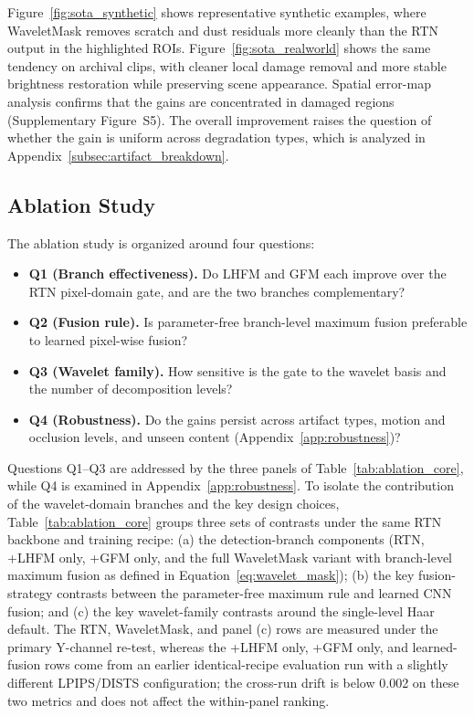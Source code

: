 \documentclass[applsci,article,submit,pdftex,moreauthors]{Definitions/mdpi}
\begin{document}
Figure~\ref{fig:sota_synthetic} shows representative synthetic examples, where WaveletMask removes scratch and dust residuals more cleanly than the RTN output in the highlighted ROIs. Figure~\ref{fig:sota_realworld} shows the same tendency on archival clips, with cleaner local damage removal and more stable brightness restoration while preserving scene appearance. Spatial error-map analysis confirms that the gains are concentrated in damaged regions (Supplementary Figure~S5). The overall improvement raises the question of whether the gain is uniform across degradation types, which is analyzed in Appendix~\ref{subsec:artifact_breakdown}.

\subsection{Ablation Study}\label{subsec:ablation}

The ablation study is organized around four questions:
\begin{itemize}
\item \textbf{Q1 (Branch effectiveness).} Do LHFM and GFM each improve over the RTN pixel-domain gate, and are the two branches complementary?
\item \textbf{Q2 (Fusion rule).} Is parameter-free branch-level maximum fusion preferable to learned pixel-wise fusion?
\item \textbf{Q3 (Wavelet family).} How sensitive is the gate to the wavelet basis and the number of decomposition levels?
\item \textbf{Q4 (Robustness).} Do the gains persist across artifact types, motion and occlusion levels, and unseen content (Appendix~\ref{app:robustness})?
\end{itemize}

Questions Q1--Q3 are addressed by the three panels of Table~\ref{tab:ablation_core}, while Q4 is examined in Appendix~\ref{app:robustness}. To isolate the contribution of the wavelet-domain branches and the key design choices, Table~\ref{tab:ablation_core} groups three sets of contrasts under the same RTN backbone and training recipe: (a) the detection-branch components (RTN, +LHFM only, +GFM only, and the full WaveletMask variant with branch-level maximum fusion as defined in Equation~\eqref{eq:wavelet_mask}); (b) the key fusion-strategy contrasts between the parameter-free maximum rule and learned CNN fusion; and (c) the key wavelet-family contrasts around the single-level Haar default. The RTN, WaveletMask, and panel (c) rows are measured under the primary Y-channel re-test, whereas the +LHFM only, +GFM only, and learned-fusion rows come from an earlier identical-recipe evaluation run with a slightly different LPIPS/DISTS configuration; the cross-run drift is below 0.002 on these two metrics and does not affect the within-panel ranking.
\end{document}
